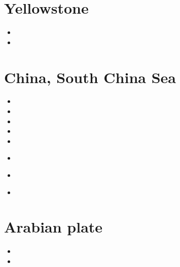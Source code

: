 \section{Yellowstone}

\begin{scriptsize}
\begin{itemize}
\item[\twothousandthirteen]
\item[\twothousandeighteen]
\end{itemize}
\end{scriptsize}

\section{China, South China Sea}

\begin{scriptsize}
\begin{itemize}
\item[\twothousandten] 
\item[\twothousandfifteen] 
\item[\twothousandsixteen] 
\item[\twothousandeighteen] 
\item[\twothousandnineteen] 
\item[\twothousandtwenty] 
 \\
\item[\twothousandtwentyone] 
 \\
\item[\twothousandtwentytwo] 
\end{itemize}
\end{scriptsize}

\section{Arabian plate}

\begin{scriptsize}
\begin{itemize}
\item[\twothousandthirteen] 
\item[\twothousandfifteen] 
\end{itemize}
\end{scriptsize}

